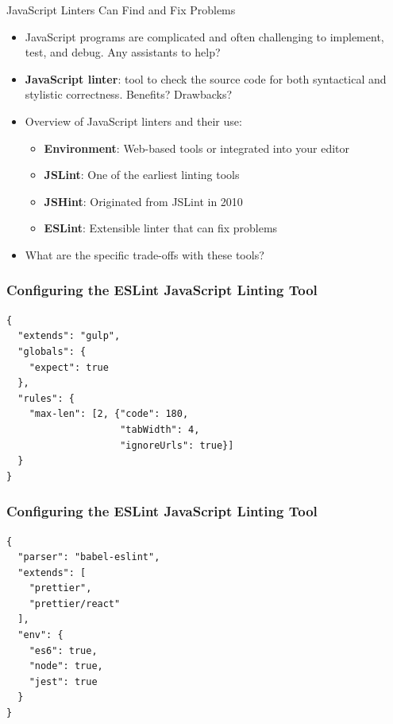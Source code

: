 \documentclass[14pt,aspectratio=169]{beamer}
\begin{document}
%
\begin{frame}{JavaScript Linters Can Find and Fix Problems}
  \begin{itemize}
    \item JavaScript programs are complicated and often challenging to
      implement, test, and debug. Any assistants to help?
      \vspace*{-.15in}
    \item {\bf JavaScript linter}: tool to check the source code for both
      syntactical and stylistic correctness. Benefits? Drawbacks?
      \vspace*{-.35in}
    \item Overview of JavaScript linters and their use:
      \begin{itemize}
        \item {\bf Environment}: Web-based tools or integrated into your editor
        \item {\bf JSLint}: One of the earliest linting tools
        \item {\bf JSHint}: Originated from JSLint in 2010
        \item {\bf ESLint}: Extensible linter that can fix problems
      \end{itemize}
      \vspace*{-.25in}
    \item What are the specific trade-offs with these tools?
  \end{itemize}
\end{frame}

%
\begin{frame}[fragile]
  \frametitle{Configuring the ESLint JavaScript Linting Tool}
  \normalsize
  \begin{minipage}{6in}
    \vspace*{.2in}
    \begin{verbatim}
{
  "extends": "gulp",
  "globals": {
    "expect": true
  },
  "rules": {
    "max-len": [2, {"code": 180,
                    "tabWidth": 4,
                    "ignoreUrls": true}]
  }
}
    \end{verbatim}
  \end{minipage}
\end{frame}

%
\begin{frame}[fragile]
  \frametitle{Configuring the ESLint JavaScript Linting Tool}
  \normalsize
  \begin{minipage}{6in}
    \vspace*{.1in}
    \begin{verbatim}
{
  "parser": "babel-eslint",
  "extends": [
    "prettier",
    "prettier/react"
  ],
  "env": {
    "es6": true,
    "node": true,
    "jest": true
  }
}
    \end{verbatim}
  \end{minipage}
\end{frame}
\end{document}
